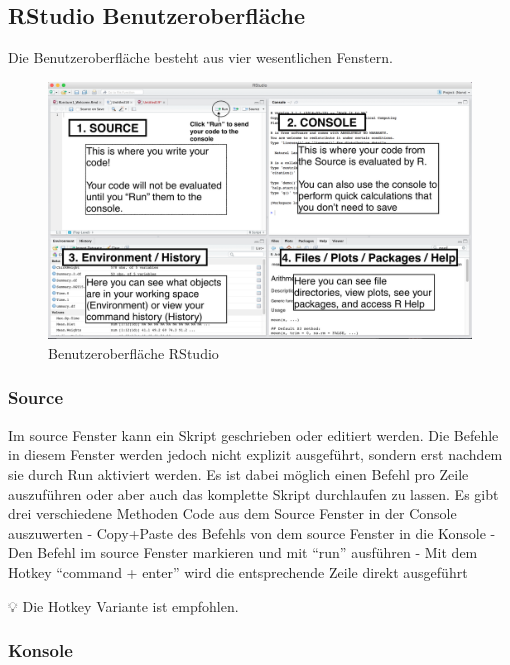 \documentclass[
]{article}
\begin{document}
\hypertarget{rstudio-benutzeroberfluxe4che}{%
\subsection{RStudio Benutzeroberfläche}\label{rstudio-benutzeroberfluxe4che}}

Die Benutzeroberfläche besteht aus vier wesentlichen Fenstern.

\begin{figure}

{\centering \includegraphics[width=1\linewidth]{images/007} 

}

\caption{Benutzeroberfläche RStudio}\label{fig:unnamed-chunk-12}
\end{figure}

\hypertarget{source}{%
\subsubsection{Source}\label{source}}

Im source Fenster kann ein Skript geschrieben oder editiert werden. Die Befehle in diesem Fenster werden jedoch nicht explizit ausgeführt, sondern erst nachdem sie durch Run aktiviert werden. Es ist dabei möglich einen Befehl pro Zeile auszuführen oder aber auch das komplette Skript durchlaufen zu lassen.
Es gibt drei verschiedene Methoden Code aus dem Source Fenster in der Console auszuwerten
- Copy+Paste des Befehls von dem source Fenster in die Konsole
- Den Befehl im source Fenster markieren und mit ``run'' ausführen
- Mit dem Hotkey ``command + enter'' wird die entsprechende Zeile direkt ausgeführt

💡 Die Hotkey Variante ist empfohlen.

\hypertarget{konsole}{%
\subsubsection{Konsole}\label{konsole}}
\end{document}
